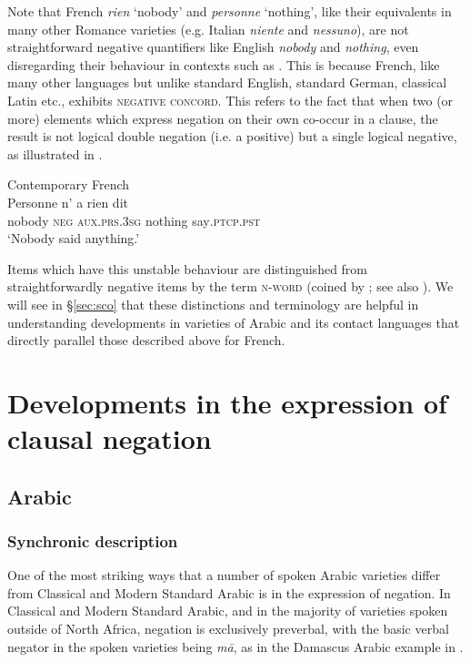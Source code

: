 \documentclass[output=paper]{langsci/langscibook}
\begin{document}
Note that French \textit{rien} ‘nobody’ and \textit{personne} ‘nothing’, like their equivalents in many other Romance varieties (e.g. Italian \textit{niente} and \textit{nessuno}), are not straightforward negative quantifiers like English \textit{nobody} and \textit{nothing}, even disregarding their behaviour in contexts such as . This is because French, like many other languages but unlike standard English, standard German, classical Latin etc., exhibits \textsc{negative} \textsc{concord}. This refers to the fact that when two (or more) elements which express negation on their own co-occur in a clause, the result is not logical double negation (i.e. a positive) but a single logical negative, as illustrated in .

\ea\label{cont2}
{       Contemporary French \citep[69]{Hansen2013}} \\
\gll Personne n’ a rien dit\\
     nobody \textsc{neg} \textsc{aux}.\textsc{prs.3sg} nothing say\textsc{.ptcp.pst}\\
\glt ‘Nobody said anything.’
\z

Items which have this unstable behaviour are distinguished from straightforwardly negative items by the term \textsc{n-word} (coined by \citealt{Laka1990}; see also \citealt{Giannakidou2006}). We will see in §\ref{sec:sco} that these distinctions and terminology are helpful in understanding developments in varieties of Arabic and its contact languages that directly parallel those described above for French.


\section{Developments in the expression of clausal negation}\label{sec:dev}


\subsection{Arabic}





\subsubsection{Synchronic description}



One of the most striking ways that a number of spoken Arabic varieties differ from Classical and Modern Standard Arabic is in the expression of negation. In Classical and Modern Standard Arabic, and in the majority of varieties spoken outside of North Africa, negation is exclusively preverbal, with the basic verbal negator in the spoken varieties being \textit{mā}, as in the Damascus Arabic example in .
\end{document}
